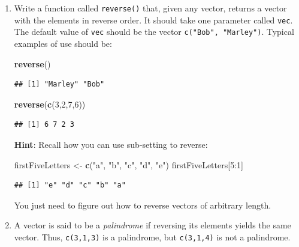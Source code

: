 \documentclass[]{book}
\makeatletter
\newenvironment{Shaded}{\begin{snugshade}}{\end{snugshade}}
\newcommand{\KeywordTok}[1]{\textcolor[rgb]{0.13,0.29,0.53}{\textbf{{#1}}}}
\newcommand{\DecValTok}[1]{\textcolor[rgb]{0.00,0.00,0.81}{{#1}}}
\newcommand{\StringTok}[1]{\textcolor[rgb]{0.31,0.60,0.02}{{#1}}}
\newcommand{\NormalTok}[1]{{#1}}
\newenvironment{kframe}{%
\medskip{}
\setlength{\fboxsep}{.8em}
 \def\at@end@of@kframe{}%
 \ifinner\ifhmode%
  \def\at@end@of@kframe{\end{minipage}}%
  \begin{minipage}{\columnwidth}%
 \fi\fi%
 \def\FrameCommand##1{\hskip\@totalleftmargin \hskip-\fboxsep
 \colorbox{shadecolor}{##1}\hskip-\fboxsep
     \hskip-\linewidth \hskip-\@totalleftmargin \hskip\columnwidth}%
 \MakeFramed {\advance\hsize-\width
   \@totalleftmargin\z@ \linewidth\hsize
   \@setminipage}}%
 {\par\unskip\endMakeFramed%
 \at@end@of@kframe}
\renewenvironment{Shaded}{\begin{kframe}}{\end{kframe}}
\theoremstyle{definition}
\theoremstyle{definition}
\theoremstyle{remark}
\makeatother
\begin{document}
{\begin{enumerate}
\begin{verbatim}
## x
## xx
## xxx
## xx
## x
\end{verbatim}
\item
  Write a function called \texttt{reverse()} that, given any vector,
  returns a vector with the elements in reverse order. It should take
  one parameter called \texttt{vec}. The default value of \texttt{vec}
  should be the vector \texttt{c("Bob",\ "Marley")}. Typical examples of
  use should be:

\begin{Shaded}
\begin{Highlighting}[]
\KeywordTok{reverse}\NormalTok{()}
\end{Highlighting}
\end{Shaded}

\begin{verbatim}
## [1] "Marley" "Bob"
\end{verbatim}

\begin{Shaded}
\begin{Highlighting}[]
\KeywordTok{reverse}\NormalTok{(}\KeywordTok{c}\NormalTok{(}\DecValTok{3}\NormalTok{,}\DecValTok{2}\NormalTok{,}\DecValTok{7}\NormalTok{,}\DecValTok{6}\NormalTok{))}
\end{Highlighting}
\end{Shaded}

\begin{verbatim}
## [1] 6 7 2 3
\end{verbatim}

  \textbf{Hint}: Recall how you can use sub-setting to reverse:

\begin{Shaded}
\begin{Highlighting}[]
\NormalTok{firstFiveLetters <-}\StringTok{ }\KeywordTok{c}\NormalTok{(}\StringTok{"a"}\NormalTok{, }\StringTok{"b"}\NormalTok{, }\StringTok{"c"}\NormalTok{, }\StringTok{"d"}\NormalTok{, }\StringTok{"e"}\NormalTok{)}
\NormalTok{firstFiveLetters[}\DecValTok{5}\NormalTok{:}\DecValTok{1}\NormalTok{]}
\end{Highlighting}
\end{Shaded}

\begin{verbatim}
## [1] "e" "d" "c" "b" "a"
\end{verbatim}

  You just need to figure out how to reverse vectors of arbitrary
  length.
\item
  A vector is said to be a \emph{palindrome} if reversing its elements
  yields the same vector. Thus, \texttt{c(3,1,3)} is a palindrome, but
  \texttt{c(3,1,4)} is not a palindrome.


\end{enumerate}}
\end{document}
